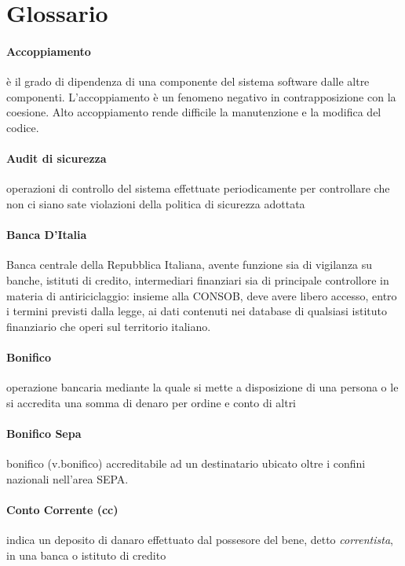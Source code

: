\section{Glossario}

\paragraph{Accoppiamento}
\`e il grado di dipendenza di una componente del sistema software dalle altre componenti.
L'accoppiamento \`e un fenomeno negativo in contrapposizione con la coesione.
Alto accoppiamento rende difficile la manutenzione e la modifica del codice.

\paragraph{Audit di sicurezza} 
	operazioni di controllo del sistema effettuate periodicamente per controllare che non ci siano sate violazioni della politica di sicurezza adottata
\paragraph{Banca D'Italia}
	 Banca centrale della Repubblica Italiana, avente funzione sia di vigilanza su banche, istituti di credito, intermediari finanziari sia di principale controllore in materia di antiriciclaggio: insieme alla CONSOB, deve avere libero accesso, entro i termini previsti dalla legge, ai dati contenuti nei database di qualsiasi istituto finanziario che operi sul territorio italiano. \cite{banca_italia}
\paragraph{Bonifico}     
	operazione bancaria mediante la quale si mette a disposizione di una persona o le si accredita una somma di denaro per ordine e conto di altri
\paragraph{Bonifico Sepa}
	bonifico (v.bonifico) accreditabile ad un destinatario ubicato oltre i confini nazionali nell'area SEPA.
\paragraph{Conto Corrente (cc)}
	indica un deposito di danaro effettuato dal possesore del bene, detto \emph{correntista}, in una banca o istituto di credito

